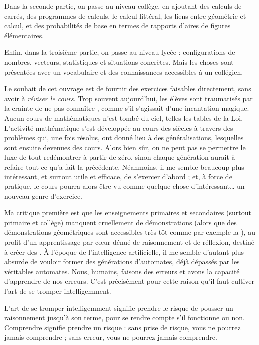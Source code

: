 Dans la seconde partie, on passe au niveau collège, en ajoutant des calculs de carrés, des programmes de calculs, le calcul littéral, les liens entre géométrie et calcul, et des probabilités de base en termes de rapports d’aires de figures élémentaires.

Enfin, dans la troisième partie, on passe au niveau lycée : configurations de nombres, vecteurs, statistiques et situations concrètes. Mais les choses sont présentées avec un vocabulaire et des connaissances accessibles à un collégien. 

Le souhait de cet ouvrage est de fournir des exercices faisables directement, sans avoir à \textit{réviser le cours}. Trop souvent aujourd’hui, les élèves sont traumatisés par la crainte de ne pas connaître , comme s’il s’agissait d’une incantation magique. Aucun cours de mathématiques n’est tombé du ciel, telles les tables de la Loi. L’activité mathématique s’est développée au cours des siècles à travers des problèmes qui, une fois résolus, ont donné lieu à des généralisations, lesquelles sont ensuite devenues des cours. Alors bien sûr, on ne peut pas se permettre le luxe de tout redémontrer à partir de zéro, sinon chaque génération aurait à refaire tout ce qu’a fait la précédente. Néanmoins, il me semble beaucoup plus intéressant, et surtout utile et efficace, de s’exercer d’abord ; et, à force de pratique, le cours pourra alors être vu comme quelque chose d’intéressant… un nouveau genre d’exercice.

Ma critique première est que les enseignements primaires et secondaires (surtout primaire et collège) manquent cruellement de démonstrations (alors que des démonstrations géométriques sont accessibles très tôt comme par exemple la  ), au profit d’un apprentissage par cœur dénué de raisonnement et de réflexion, destiné à créer des . À l’époque de l’intelligence artificielle, il me semble d’autant plus absurde de vouloir former des générations d’automates, déjà dépassés par les véritables automates. Nous, humains, faisons des erreurs et avons la capacité d’apprendre de nos erreurs. C’est précisément pour cette raison qu’il faut cultiver l’art de se tromper intelligemment.

L’art de se tromper intelligemment signifie prendre le risque de pousser un raisonnement jusqu’à son terme, pour se rendre compte s’il fonctionne ou non. Comprendre signifie prendre un risque : sans prise de risque, vous ne pourrez jamais comprendre ; sans erreur, vous ne pourrez jamais comprendre.

